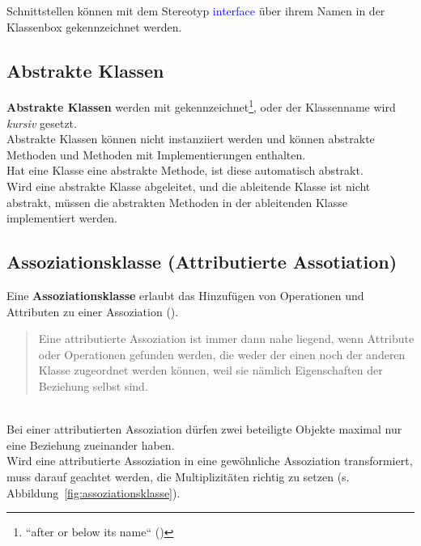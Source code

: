 \noindent
Schnittstellen können mit dem Stereotyp \textcolor{blue}{\guillemotleft interface\guillemotright} über ihrem Namen in der Klassenbox gekennzeichnet werden.

\subsection{Abstrakte Klassen}
\textbf{Abstrakte Klassen} werden mit  gekennzeichnet\footnote{
``after or below its name`` (\cite[101]{OMG17})
}, oder der Klassenname wird \textit{kursiv} gesetzt.\\
Abstrakte Klassen können nicht instanziiert werden und können abstrakte Methoden und Methoden mit Implementierungen enthalten.\\
Hat eine Klasse eine abstrakte Methode, ist diese automatisch abstrakt.\\
Wird eine abstrakte Klasse abgeleitet, und die ableitende Klasse ist nicht abstrakt, müssen die abstrakten Methoden in der ableitenden Klasse implementiert werden.

\subsection{Assoziationsklasse (Attributierte Assotiation)}
Eine \textbf{Assoziationsklasse} erlaubt das Hinzufügen von Operationen und Attributen zu einer Assoziation (\cite[43]{Buh09}).

\blockquote[{\cite[277]{Oes05}}]{
Eine attributierte Assoziation ist immer dann nahe liegend, wenn Attribute oder Operationen gefunden werden, die weder der einen noch der anderen Klasse zugeordnet werden können, weil sie nämlich Eigenschaften der Beziehung selbst sind.
}.\\

\noindent
Bei einer attributierten Assoziation dürfen zwei beteiligte Objekte maximal nur eine Beziehung zueinander haben.\\

\noindent
Wird eine attributierte Assoziation in eine gewöhnliche Assoziation transformiert, muss darauf geachtet werden, die Multiplizitäten richtig zu setzen (s. Abbildung~\ref{fig:assoziationsklasse}).

